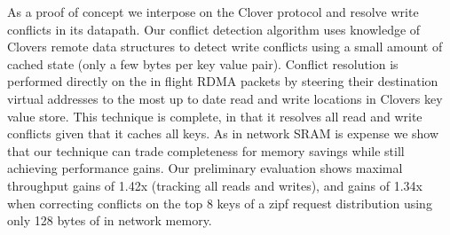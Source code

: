 As a proof of concept we interpose on the Clover protocol and resolve
write conflicts in its datapath. Our conflict detection algorithm uses
knowledge of Clovers remote data structures to detect write conflicts
using a small amount of cached state (only a few bytes per key value
pair). Conflict resolution is performed directly on the in flight RDMA
packets by steering their destination virtual addresses to the most up
to date read and write locations in Clovers key value store. This
technique is complete, in that it resolves all read and write
conflicts given that it caches all keys. As in network SRAM is expense
we show that our technique can trade completeness for memory savings
while still achieving performance gains. Our preliminary evaluation
shows maximal throughput gains of 1.42x (tracking all reads and
writes), and gains of 1.34x when correcting conflicts on the top 8
keys of a zipf request distribution using only 128 bytes of in network
memory.
